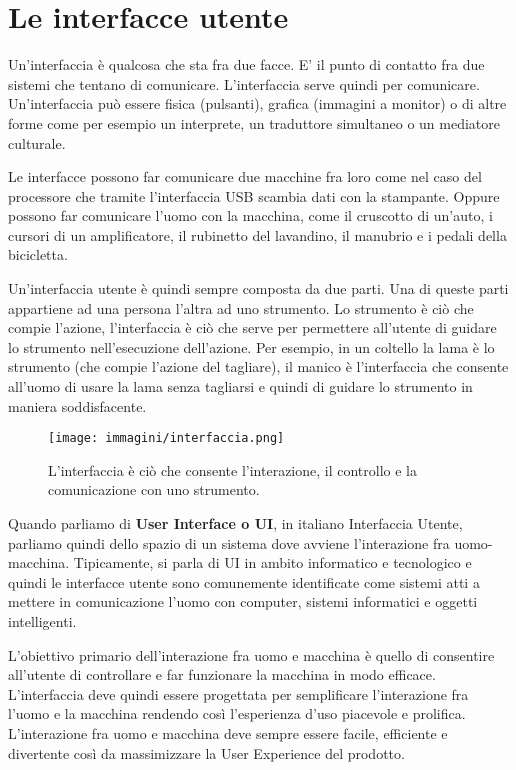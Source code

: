 \chapter{Le interfacce utente}

Un'interfaccia è qualcosa che sta fra due facce. E' il punto di contatto fra due sistemi che tentano di comunicare. L'interfaccia serve quindi per comunicare. Un'interfaccia può essere fisica (pulsanti), grafica (immagini a monitor) o di altre forme come per esempio un interprete, un traduttore simultaneo o un mediatore culturale. 

Le interfacce possono far comunicare due macchine fra loro come nel caso del processore che tramite l'interfaccia USB scambia dati con la stampante. Oppure possono far comunicare l’uomo con la macchina, come il cruscotto di un’auto, i cursori di un amplificatore, il rubinetto del lavandino, il manubrio e i pedali della bicicletta.

Un'interfaccia utente è quindi sempre composta da due parti. Una di queste parti appartiene ad una persona l'altra ad uno strumento. Lo strumento è ciò che compie l'azione, l’interfaccia è ciò che serve per permettere all'utente di guidare lo strumento nell'esecuzione dell'azione. Per esempio, in un coltello la lama è lo strumento (che compie l'azione del tagliare), il manico è l’interfaccia che consente all'uomo di usare la lama senza tagliarsi e quindi di guidare lo strumento in maniera soddisfacente. 

\begin{figure}[!h]
	\centering
	\texttt{[image: immagini/interfaccia.png]}
	\caption{L'interfaccia è ciò che consente l'interazione, il controllo e la comunicazione con uno strumento.}
\end{figure}


Quando parliamo di \textbf{User Interface o UI}, in italiano Interfaccia Utente, parliamo quindi dello spazio di un sistema dove avviene l'interazione fra uomo-macchina. Tipicamente, si parla di UI in ambito informatico e tecnologico e quindi le interfacce utente sono comunemente identificate come sistemi atti a mettere in comunicazione l'uomo con computer, sistemi informatici e oggetti intelligenti.

L'obiettivo primario dell'interazione fra uomo e macchina è quello di consentire all'utente di controllare e far funzionare la macchina in modo efficace. L'interfaccia deve quindi essere progettata per semplificare l'interazione fra l'uomo e la macchina rendendo così l'esperienza d'uso piacevole e prolifica. L'interazione fra uomo e macchina deve sempre essere facile, efficiente e divertente così da massimizzare la User Experience del prodotto.

